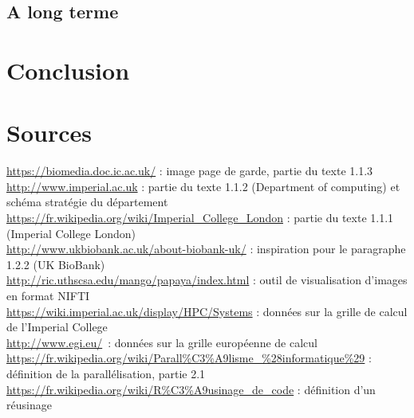 \documentclass[10pt]{report}
\begin{document}
	\section{A long terme}

\chapter*{Conclusion} %
\chapter*{Sources}
\noindent
\url{https://biomedia.doc.ic.ac.uk/}  : image page de garde, partie du texte 1.1.3 \\
\url{http://www.imperial.ac.uk} : partie du texte 1.1.2 (Department of computing) et schéma stratégie du département\\
\url{https://fr.wikipedia.org/wiki/Imperial_College_London} : partie du texte 1.1.1 (Imperial College London)\\
\url{http://www.ukbiobank.ac.uk/about-biobank-uk/} : inspiration pour le paragraphe 1.2.2 (UK BioBank)\\
\url{http://ric.uthscsa.edu/mango/papaya/index.html} : outil de visualisation d'images en format NIFTI\\
\url{https://wiki.imperial.ac.uk/display/HPC/Systems} : données sur la grille de calcul de l'Imperial College\\
\url{http://www.egi.eu/} : données sur la grille européenne de calcul
\url{https://fr.wikipedia.org/wiki/Parall\%C3\%A9lisme_\%28informatique\%29} : définition de la parallélisation, partie 2.1\\
\url{https://fr.wikipedia.org/wiki/R\%C3\%A9usinage_de_code} :  définition d'un réusinage \\
\renewcommand{\listfigurename}{Table des illustations}
\listoffigures
{}
\end{document}

